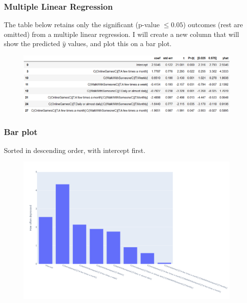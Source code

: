 \documentclass{beamer}
\begin{document}
\begin{frame}

    \frametitle{Multiple Linear Regression}
    
    The table below retains only the significant (p-value $\leq 0.05$) outcomes (rest are omitted) from a multiple linear regression.
    I will create a new column that will show the predicted $\hat y$ values, and plot this on a bar plot.
    \begin{figure}
        \centering
        \includegraphics[width=0.8\linewidth]{jason_regressionoutcome.png}
    \end{figure}
    
    \end{frame}

\begin{frame}
    \frametitle{Bar plot}

    {\tiny Sorted in descending order, with intercept first.}

    \begin{figure}
        \centering
        \includegraphics[width=1\linewidth]{jason_barplot.png}
    \end{figure}

\end{frame}
\end{document}
